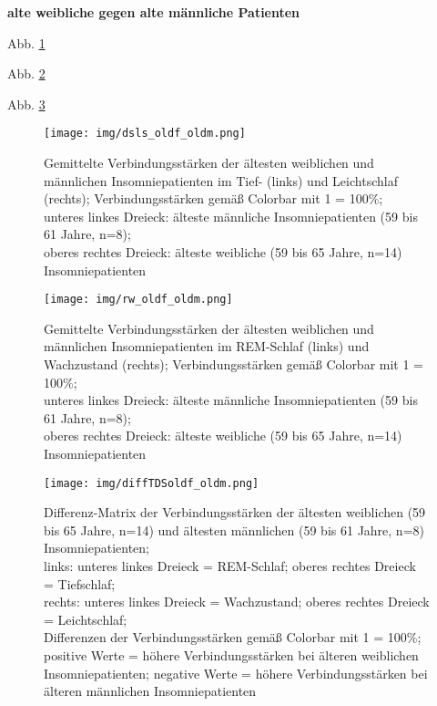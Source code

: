 \textbf{alte weibliche gegen alte männliche Patienten}

Abb. \ref{fig:dsls_oldf_oldm}

Abb. \ref{fig:rw_oldf_oldm}

Abb. \ref{fig:diffTDSoldf_oldm}

\begin{figure}[H]
	\centering
	\texttt{[image: img/dsls\_oldf\_oldm.png]}
	\caption[Verbindungsstärken der ältesten weiblichen und männlichen Insomniepatienten im Tief- und Leichtschlaf]{Gemittelte Verbindungsstärken der ältesten weiblichen und männlichen Insomniepatienten im Tief- (links) und Leichtschlaf (rechts); Verbindungsstärken gemäß Colorbar mit 1 = 100\%;\\unteres linkes Dreieck: älteste männliche Insomniepatienten (59 bis 61 Jahre, n=8);\\oberes rechtes Dreieck: älteste weibliche (59 bis 65 Jahre, n=14) Insomniepatienten}
	\label{fig:dsls_oldf_oldm}
\end{figure}

\begin{figure}[H]
	\centering
	\texttt{[image: img/rw\_oldf\_oldm.png]}
	\caption[Verbindungsstärken der ältesten weiblichen und männlichen Insomniepatienten im REM-Schlaf und Wachzustand]{Gemittelte Verbindungsstärken der ältesten weiblichen und männlichen Insomniepatienten im REM-Schlaf (links) und Wachzustand (rechts); Verbindungsstärken gemäß Colorbar mit 1 = 100\%;\\unteres linkes Dreieck: älteste männliche Insomniepatienten (59 bis 61 Jahre, n=8);\\oberes rechtes Dreieck: älteste weibliche (59 bis 65 Jahre, n=14) Insomniepatienten}
	\label{fig:rw_oldf_oldm}
\end{figure}

\begin{figure}[H]
	\centering
	\texttt{[image: img/diffTDSoldf\_oldm.png]}
	\caption[Differenz-Matrix der Verbindungsstärken der ältesten weiblichen und männlichen Insomniepatienten]{Differenz-Matrix der Verbindungsstärken der ältesten weiblichen (59 bis 65 Jahre, n=14) und ältesten männlichen (59 bis 61 Jahre, n=8) Insomniepatienten;\\links: unteres linkes Dreieck = REM-Schlaf; oberes rechtes Dreieck = Tiefschlaf;\\rechts: unteres linkes Dreieck = Wachzustand; oberes rechtes Dreieck = Leichtschlaf;\\Differenzen der Verbindungsstärken gemäß Colorbar mit 1 = 100\%;\\positive Werte = höhere Verbindungsstärken bei älteren weiblichen Insomniepatienten; negative Werte = höhere Verbindungsstärken bei älteren männlichen Insomniepatienten}
	\label{fig:diffTDSoldf_oldm}
\end{figure}




